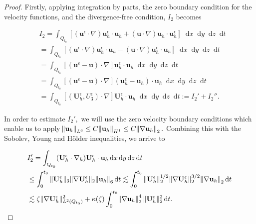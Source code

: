 \documentclass[12pt]{report}
\numberwithin{theorem}{chapter}
\numberwithin{corollary}{chapter}
\numberwithin{lemma}{chapter}
\numberwithin{remark}{chapter}
\numberwithin{definition}{chapter}
\numberwithin{prop}{chapter}
\newcommand*\diff{\mathop{}\!\mathrm{d}}
\begin{document}
\begin{proof}
  Firstly, applying integration by parts, the zero boundary condition for the velocity functions, and the divergence-free condition, $I_2$ becomes
  
  \begin{equation}
    \begin{split}
      & I_2 = \int_{Q_{t_0}} [(\mathbf{u}^\epsilon \cdot \nabla) \mathbf{u}_h^\epsilon \cdot \mathbf{u}_h + (\mathbf{u} \cdot \nabla )\mathbf{u}_h \cdot \mathbf{u}_h^\epsilon] \diff x \diff y \diff z \diff t \\
      & = \int_{Q_{t_0}} [(\mathbf{u}^\epsilon \cdot \nabla) \mathbf{u}_h^\epsilon \cdot \mathbf{u}_h - (\mathbf{u} \cdot \nabla )\mathbf{u}^\epsilon_h \cdot \mathbf{u}_h] \diff x \diff y \diff z \diff t \\
      & = \int_{Q_{t_0}} [(\mathbf{u}^\epsilon - \mathbf{u}) \cdot \nabla ] \mathbf{u}_h^\epsilon \cdot \mathbf{u}_h  \diff x \diff y \diff z \diff t \\
      & = \int_{Q_{t_0}} [(\mathbf{u}^\epsilon - \mathbf{u}) \cdot \nabla ] (\mathbf{u}_h^\epsilon - \mathbf{u}_h) \cdot \mathbf{u}_h  \diff x \diff y \diff z \diff t \\
      & = \int_{Q_{t_0}} [(\mathbf{U}_h^\epsilon, U^\epsilon_3) \cdot \nabla ] \mathbf{U}_h^\epsilon \cdot \mathbf{u}_h  \diff x \diff y \diff z \diff t := I_2' + I_2''.
    \end{split}
  \end{equation}
  
  In order to estimate $I_2',$ we will use the zero velocity boundary conditions which enable us to apply $\norm{\mathbf{u}_h}_{L^6} \leq C \norm{\mathbf{u}_h}_{H^1} \leq C \norm{\nabla \mathbf{u}_h}_2.$ Combining this with the Sobolev, Young and H\"older inequalities, we arrive to
  
  \begin{equation} \label{I_2_prime}
    \begin{split}
      & I_2'= \int_{Q_{t_0}} (\mathbf{U}^\epsilon_h \cdot \nabla_h) \mathbf{U}^\epsilon_h \cdot \mathbf{u}_h \diff x \diff y \diff z \diff t \\
      & \leq \int_0^{t_0} \| \mathbf{U}^\epsilon_h \| _3 \| \nabla \mathbf{U}^\epsilon_h \| _2 \norm{\mathbf{u}_h}_6 \diff t \lesssim \int_0^{t_0} \| \mathbf{U}^\epsilon_h \| _2^{1/2} \| \nabla \mathbf{U}^\epsilon_h \|_2^{3/2} \norm{\nabla \mathbf{u}_h}_2 \diff t \\
      & \lesssim \zeta \| \nabla \mathbf{U}^\epsilon_h \| ^2_{L^2(Q_{t_0})} + \kappa(\zeta) \int_0^{t_0} \norm{\nabla \mathbf{u}_h}_2^4 \| \mathbf{U}^\epsilon_h \| _2^2 \diff t.
    \end{split}
  \end{equation}
  

\end{proof}
\end{document}
